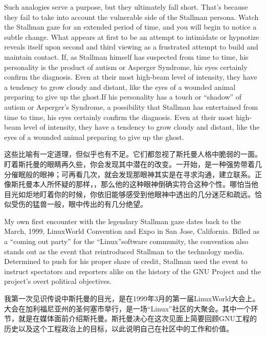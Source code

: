 \ifdefined\eng
Such analogies serve a purpose, but they ultimately fall short. That's because they fail to take into account the vulnerable side of the Stallman persona. Watch the Stallman gaze for an extended period of time, and you will begin to notice a subtle change. What appears at first to be an attempt to intimidate or hypnotize reveals itself upon second and third viewing as a frustrated attempt to build and maintain contact. \ifdefined\vone If, as Stallman himself has suspected from time to time, his personality is the product of autism or Asperger Syndrome, his eyes certainly confirm the diagnosis. Even at their most high-beam level of intensity, they have a tendency to grow cloudy and distant, like the eyes of a wounded animal preparing to give up the ghost.\fi\ifdefined\vtwo If his personality has a touch or ``shadow'' of autism or Asperger's Syndrome, a possibility that Stallman has entertained from time to time, his eyes certainly confirm the diagnosis. Even at their most high-beam level of intensity, they have a tendency to grow cloudy and distant, like the eyes of a wounded animal preparing to give up the ghost.\fi
\fi

\ifdefined\chs
这些比喻有一定道理，但似乎也有不足。它们都忽视了斯托曼人格中脆弱的一面。盯着斯托曼的眼睛再久些，你会发现其中潜在的改变。一开始，是一种强势带着几分催眠般的眼神；可再看几次，就会发现那眼神其实是在寻求沟通，建立联系。\ifdefined\vone 正像斯托曼本人所怀疑的那样，，那么他的这种眼神倒确实符合这种个性。哪怕当他目光如炬地盯着你的时候，你依旧能够感受到他眼神中透出的几分迷茫和疏远。恰似受伤的猛兽一般，眼中传出的有几分绝望。
\fi

\ifdefined\eng
My own first encounter with the legendary Stallman gaze dates back to the March, 1999, LinuxWorld Convention and Expo in San Jose, California. Billed as a ``coming out party'' for the \ifdefined\vtwo ``\fi Linux\ifdefined\vtwo ''\fi software community, the convention also stands out as the event that reintroduced Stallman to the technology media. Determined to push for his proper share of credit, Stallman used the event to instruct spectators and reporters alike on the history of the GNU Project and the project's overt political objectives.
\fi

\ifdefined\chs
我第一次见识传说中斯托曼的目光，是在1999年3月的第一届LinuxWorld大会上。大会在加利福尼亚州的圣何塞市举行，是一场``Linux''社区的大聚会。其中一个环节，就是在媒体面前介绍斯托曼。斯托曼决心在这次见面上简要回顾GNU工程的历史以及这个工程政治上的目标，以此说明自己在社区中的工作和价值。
\fi

